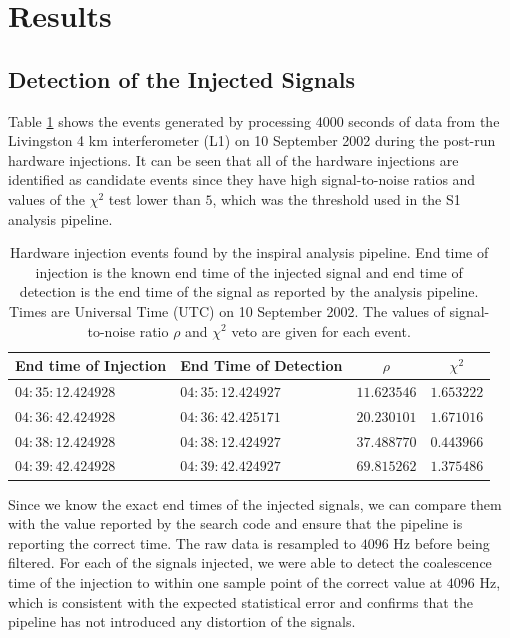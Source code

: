 \section{Results}

\subsection{Detection of the Injected Signals}
\label{ss:detection}

Table \ref{t:triggers} shows the events generated by processing 4000 seconds
of data from the Livingston 4 km interferometer (L1) on 10 September 2002
during the post-run hardware injections.  It can be seen that all of
the hardware injections are identified as candidate events since they have
high signal-to-noise ratios and values of the $\chi^2$ test lower than $5$,
which was the threshold used in the S1 analysis pipeline\cite{abbott2003b}.
\begin{table}[htb]
  \begin{flushright}
  \begin{tabular}{l|l|c|c}
  End time of Injection&End Time of Detection&$\rho$&$\chi^2$\\
  \hline
  $04:35:12.424928$ & $04:35:12.424927$ & $11.623546$ & $1.653222$ \\
  $04:36:42.424928$ & $04:36:42.425171$ & $20.230101$ & $1.671016$ \\
  $04:38:12.424928$ & $04:38:12.424927$ & $37.488770$ & $0.443966$ \\
  $04:39:42.424928$ & $04:39:42.424927$ & $69.815262$ & $1.375486$ \\
  \end{tabular}
  \end{flushright}
  \caption{%
  Hardware injection events found by the inspiral analysis pipeline. End time
  of injection is the known end time of the injected signal and end time of
  detection is the end time of the signal as reported by the analysis
  pipeline. Times are Universal Time (UTC) on 10 September 2002. The values of
  signal-to-noise ratio $\rho$ and $\chi^2$ veto are given for each event.
  }
\label{t:triggers}
\end{table}

Since we know the exact end times of the injected signals, we can compare them
with the value reported by the search code and ensure that the pipeline is
reporting the correct time. The raw data is resampled to $4096$ Hz before
being filtered. For each of the signals injected, we were able to detect the
coalescence time of the injection to within one sample point of the correct
value at $4096$ Hz, which is consistent with the expected statistical error
and confirms that the pipeline has not introduced any distortion of the
signals.

